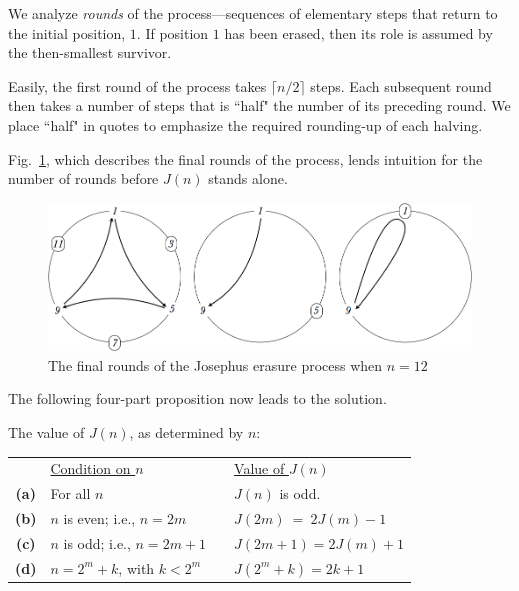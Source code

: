 \begin{enumerate}
\medskip

We analyze \textit{rounds} of the process---sequences of elementary steps that return to the initial position, $1$.  If position $1$ has been erased, then its role is assumed by the then-smallest survivor.

\smallskip

Easily, the first round of the process takes $\lceil n/2 \rceil$ steps.  Each subsequent round then takes a number of steps that is ``half" the number of its preceding round.  We place ``half" in quotes to emphasize the required rounding-up of each halving.  

\medskip

Fig.~\ref{fig:josephus12step2}, which describes the final rounds of the process, lends intuition for the number of rounds before $J(n)$ stands alone.
\begin{figure}[ht]
\begin{center}
        \includegraphics[scale=0.25]{FiguresMaths/josephus12LastSteps}
        \caption{The final rounds of the Josephus erasure process when $n=12$}
        \label{fig:josephus12step2}
\end{center}
\end{figure}

\medskip

The following four-part proposition now leads to the solution.

\begin{prop}
The value of $J(n)$, as determined by $n$:

\begin{tabular}{clll}
 & \underline{Condition on $n$} & \hspace*{.1in} & \underline{Value of $J(n)$} \\ 
{\bf (a)} &
For all $n$ &  & $J(n)$ is odd. \\
{\bf (b)} &
$n$ is even; i.e., $n = 2m$ & & $J(2m) \ = \ 2J(m)-1$ \\
{\bf (c)} &
$n$ is odd; i.e., $n = 2m+1$ & & $J(2m+1) = 2J(m)+1$ \\
{\bf (d)} &
$n = 2^m+k$, with $k < 2^m$ & & $J(2^m+k) = 2k+1$
\end{tabular}
\end{prop}


\end{enumerate}
